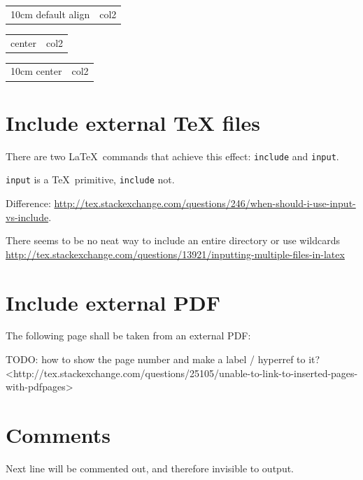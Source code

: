 \documentclass[12pt]{article}
\begin{document}
    \begin{tabular}{>{}m{10cm} | l}
      10cm default align & col2
    \end{tabular}

    \begin{tabular}{>{\centering}m{10cm} | l}
      10cm center & col2
    \end{tabular}

    \begin{tabular}{>{}m{10cm} | l}
      10cm center & col2
    \end{tabular}

\section{Include external TeX files}\label{include}

  There are two \LaTeX\ commands that achieve this effect: \lstinline|include| and \lstinline|input|.

  \lstinline|input| is a \TeX\ primitive, \lstinline|include| not.

  Difference: \url{http://tex.stackexchange.com/questions/246/when-should-i-use-input-vs-include}.

  There seems to be no neat way to include an entire directory or use wildcards \url{http://tex.stackexchange.com/questions/13921/inputting-multiple-files-in-latex}

\section{Include external PDF}\label{include-external-pdf}

  The following page shall be taken from an external PDF:

  

  TODO: how to show the page number and make a label / hyperref to it? <http://tex.stackexchange.com/questions/25105/unable-to-link-to-inserted-pages-with-pdfpages>

\section{Comments}\label{comments}

  Next line will be commented out, and therefore invisible to output.

\end{document}
